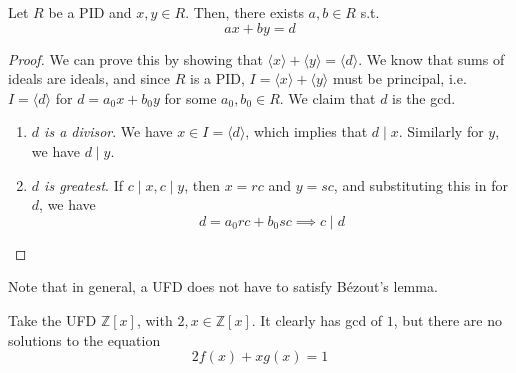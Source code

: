   \begin{lemma}
    \label{thm:bezouts-lemma-in-pids}
    Let $R$ be a PID and $x, y \in R$. Then, there exists $a, b \in R$ s.t. 
    \begin{equation}
      ax + by = d
    \end{equation}
  \end{lemma}
  \begin{proof}
    We can prove this by showing that $\langle x \rangle + \langle y \rangle = \langle d \rangle$. We know that sums of ideals are ideals, and since $R$ is a PID, $I = \langle x \rangle + \langle y \rangle$ must be principal, i.e. $I = \langle d \rangle$ for $d = a_0 x + b_0 y$ for some $a_0, b_0 \in R$. We claim that $d$ is the gcd. 
    \begin{enumerate}
      \item \textit{$d$ is a divisor}. We have $x \in I = \langle d \rangle$, which implies that $d \mid x$. Similarly for $y$, we have $d \mid y$. 
      \item \textit{$d$ is greatest}. If $c \mid x, c \mid y$, then $x = rc$ and $y = sc$, and substituting this in for $d$, we have 
        \begin{equation}
          d = a_0 r c + b_0 s c \implies c \mid d 
        \end{equation} 
    \end{enumerate}
  \end{proof}

  Note that in general, a UFD does not have to satisfy Bézout's lemma. 

  \begin{example}
    \label{ex:ufds-doesnt-necessarily-satisfy-bezouts-lemma}
    Take the UFD $\mathbb{Z}[x]$, with $2, x \in \mathbb{Z}[x]$. It clearly has gcd of $1$, but there are no solutions to the equation 
    \begin{equation}
      2 f(x) + x g(x) = 1
    \end{equation}
  \end{example}

